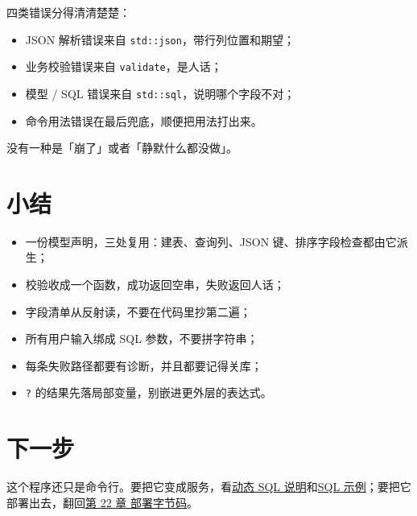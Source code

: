 四类错误分得清清楚楚：

\begin{itemize}

\item JSON 解析错误来自 \texttt{std:\allowbreak{}:\allowbreak{}json}，带行列位置和期望；

\item 业务校验错误来自 \texttt{validate}，是人话；

\item 模型 / SQL 错误来自 \texttt{std:\allowbreak{}:\allowbreak{}sql}，说明哪个字段不对；

\item 命令用法错误在最后兜底，顺便把用法打出来。

\end{itemize}

没有一种是「崩了」或者「静默什么都没做」。

\section{小结}

\begin{itemize}

\item 一份模型声明，三处复用：建表、查询列、JSON 键、排序字段检查都由它派生；

\item 校验收成一个函数，成功返回空串，失败返回人话；

\item 字段清单从反射读，不要在代码里抄第二遍；

\item 所有用户输入绑成 SQL 参数，不要拼字符串；

\item 每条失败路径都要有诊断，并且都要记得关库；

\item \texttt{?} 的结果先落局部变量，别嵌进更外层的表达式。

\end{itemize}

\section{下一步}

这个程序还只是命令行。要把它变成服务，看\href{https://gitee.com/rabbitc999/chali/blob/master/doc/36-reflection-serialization-sql.md}{动态 SQL 说明}和\href{https://gitee.com/rabbitc999/chali/blob/master/example/sql-chali/README.md}{SQL 示例}；要把它部署出去，翻回\hyperref[ch:22]{第 22 章 部署字节码}。


